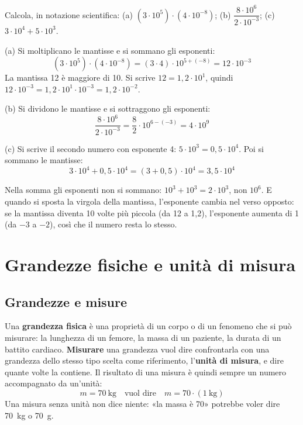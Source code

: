 \begin{esempio}
Calcola, in notazione scientifica: (a) $(3 \cdot 10^{5}) \cdot (4 \cdot 10^{-8})$; (b) $\dfrac{8 \cdot 10^{6}}{2 \cdot 10^{-3}}$; (c) $3 \cdot 10^{4} + 5 \cdot 10^{3}$.

(a) Si moltiplicano le mantisse e si sommano gli esponenti:
\[
  (3 \cdot 10^{5}) \cdot (4 \cdot 10^{-8}) = (3 \cdot 4) \cdot 10^{5+(-8)} = 12 \cdot 10^{-3}
\]
La mantissa 12 è maggiore di 10. Si scrive $12 = 1{,}2 \cdot 10^{1}$, quindi $12 \cdot 10^{-3} = 1{,}2 \cdot 10^{1} \cdot 10^{-3} = 1{,}2 \cdot 10^{-2}$.

(b) Si dividono le mantisse e si sottraggono gli esponenti:
\[
  \frac{8 \cdot 10^{6}}{2 \cdot 10^{-3}} = \frac{8}{2} \cdot 10^{6-(-3)} = 4 \cdot 10^{9}
\]

(c) Si scrive il secondo numero con esponente 4: $5 \cdot 10^{3} = 0{,}5 \cdot 10^{4}$. Poi si sommano le mantisse:
\[
  3 \cdot 10^{4} + 0{,}5 \cdot 10^{4} = (3 + 0{,}5) \cdot 10^{4} = 3{,}5 \cdot 10^{4}
\]
\end{esempio}

\begin{attenzione}
Nella somma gli esponenti non si sommano: $10^{3} + 10^{3} = 2 \cdot 10^{3}$, non $10^{6}$. E quando si sposta la virgola della mantissa, l'esponente cambia nel verso opposto: se la mantissa diventa 10 volte più piccola (da 12 a 1,2), l'esponente aumenta di 1 (da $-3$ a $-2$), così che il numero resta lo stesso.
\end{attenzione}



\section{Grandezze fisiche e unità di misura}
\label{sec:ud1-grandezze}

\subsection{Grandezze e misure}

Una \textbf{grandezza fisica} è una proprietà di un corpo o di un fenomeno che si può misurare: la lunghezza di un femore, la massa di un paziente, la durata di un battito cardiaco. \textbf{Misurare} una grandezza vuol dire confrontarla con una grandezza dello stesso tipo scelta come riferimento, l'\textbf{unità di misura}, e dire quante volte la contiene. Il risultato di una misura è quindi sempre un numero accompagnato da un'unità:
\[
  m = \SI{70}{\kilo\gram} \quad\text{vuol dire}\quad m = 70 \cdot (\SI{1}{\kilo\gram})
\]
Una misura senza unità non dice niente: «la massa è 70» potrebbe voler dire \SI{70}{\kilo\gram} o \SI{70}{\gram}.

